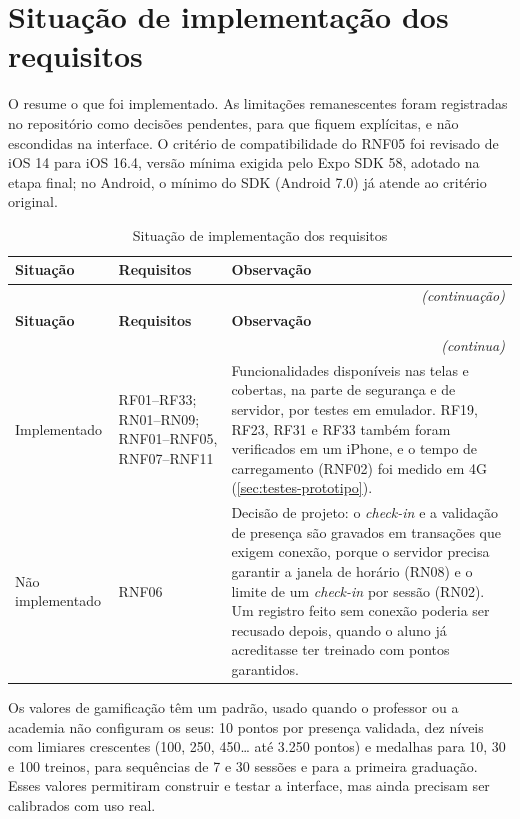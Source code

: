 \section{Situação de implementação dos requisitos}
\label{sec:situacao-implementacao}

O  resume o que foi implementado. As
limitações remanescentes foram registradas no repositório como decisões
pendentes, para que fiquem explícitas, e não escondidas na interface. O
critério de compatibilidade do RNF05 foi revisado de iOS 14 para iOS
16.4, versão mínima exigida pelo Expo SDK 58, adotado na etapa final; no
Android, o mínimo do SDK (Android 7.0) já atende ao critério original.

\begin{quadrolongo}
\begin{longtable}{|p{2.2cm}|p{4.2cm}|p{7.0cm}|}
  \caption{Situação de implementação dos requisitos}\label{qua:implementacao}\\
  \hline
  \textbf{Situação} & \textbf{Requisitos} & \textbf{Observação} \\ \hline
\endfirsthead
  \multicolumn{3}{r}{\textit{(continuação)}}\\
  \hline
  \textbf{Situação} & \textbf{Requisitos} & \textbf{Observação} \\ \hline
\endhead
  \multicolumn{3}{r}{\textit{(continua)}}\\
\endfoot
\endlastfoot
    Implementado & RF01--RF33; RN01--RN09; RNF01--RNF05, RNF07--RNF11 & Funcionalidades disponíveis nas telas e cobertas, na parte de segurança e de servidor, por testes em emulador. RF19, RF23, RF31 e RF33 também foram verificados em um iPhone, e o tempo de carregamento (RNF02) foi medido em 4G (\autoref{sec:testes-prototipo}). \\ \hline
    Não implementado & RNF06 & Decisão de projeto: o \textit{check-in} e a validação de presença são gravados em transações que exigem conexão, porque o servidor precisa garantir a janela de horário (RN08) e o limite de um \textit{check-in} por sessão (RN02). Um registro feito sem conexão poderia ser recusado depois, quando o aluno já acreditasse ter treinado com pontos garantidos. \\ \hline
\end{longtable}
\end{quadrolongo}

Os valores de gamificação têm um padrão, usado quando o professor ou a
academia não configuram os seus: 10 pontos por presença validada, dez
níveis com limiares crescentes (100, 250, 450\ldots{} até 3.250 pontos) e
medalhas para 10, 30 e 100 treinos, para sequências de 7 e 30 sessões e
para a primeira graduação. Esses valores permitiram construir e testar a
interface, mas ainda precisam ser calibrados com uso real.

